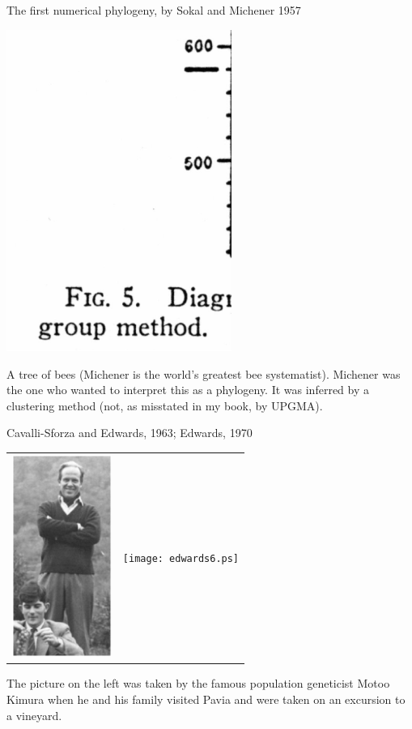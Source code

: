\documentclass[bluish,slideColor,colorBG,pdf]{prosper}
\begin{document}
\begin{slide}[Replace]{The first numerical phylogeny, by Sokal and Michener 1957}

\begin{center}
\includegraphics[width=2.9in]{sokaltree.ps}
\end{center}

A tree of bees (Michener is the world's greatest bee systematist).
Michener was the one who wanted to interpret this as a phylogeny.  It was
inferred by a clustering method (not, as misstated in my book, by UPGMA).

\end{slide}

\begin{slide}[Replace]{Cavalli-Sforza and Edwards, 1963; Edwards, 1970}

\begin{center}
\begin{tabular}{r l}
\includegraphics[height=2.6in]{cavedwards3.ps} &
\texttt{[image: edwards6.ps]}
\end{tabular}
\end{center}

The picture on the left was taken by the famous population geneticist
Motoo Kimura when he and his family visited Pavia and were taken
on an excursion to a vineyard.

\end{slide}
\end{document}
